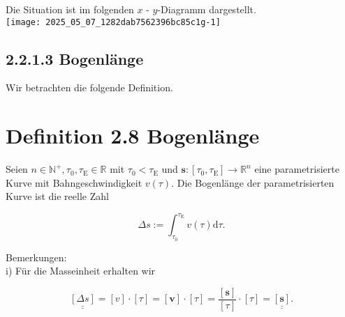 \documentclass[10pt]{article}
\begin{document}
Die Situation ist im folgenden $x$ - $y$-Diagramm dargestellt.\\
\texttt{[image: 2025\_05\_07\_1282dab7562396bc85c1g-1]}

\subsection*{2.2.1.3 Bogenlänge}
Wir betrachten die folgende Definition.

\section*{Definition 2.8 Bogenlänge}
Seien $n \in \mathbb{N}^{+}, \tau_{0}, \tau_{\mathrm{E}} \in \mathbb{R}$ mit $\tau_{0}<\tau_{\mathrm{E}}$ und $\mathbf{s}:\left[\tau_{0}, \tau_{\mathrm{E}}\right] \rightarrow \mathbb{R}^{n}$ eine parametrisierte Kurve mit Bahngeschwindigkeit $v(\tau)$. Die Bogenlänge der parametrisierten Kurve ist die reelle Zahl


\begin{equation*}
\Delta s:=\int_{\tau_{0}}^{\tau_{\mathrm{E}}} v(\tau) \mathrm{d} \tau . \tag{2.49}
\end{equation*}


Bemerkungen:\\
i) Für die Masseinheit erhalten wir


\begin{equation*}
\underline{\underline{[\Delta s]}}=[v] \cdot[\tau]=[\mathbf{v}] \cdot[\tau]=\frac{[\mathbf{s}]}{[\tau]} \cdot[\tau]=\underline{\underline{[\mathbf{s}]}} . \tag{2.50}
\end{equation*}
\end{document}
